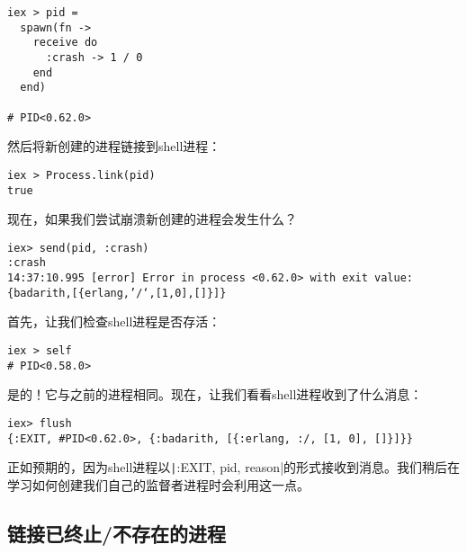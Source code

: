 \begin{code}{}
\begin{verbatim}
iex > pid =
  spawn(fn ->
    receive do
      :crash -> 1 / 0
    end
  end)

# PID<0.62.0>
\end{verbatim}
\end{code}

然后将新创建的进程链接到shell进程：

\begin{code}{}
\begin{verbatim}
iex > Process.link(pid)
true
\end{verbatim}
\end{code}

现在，如果我们尝试崩溃新创建的进程会发生什么？

\begin{code}{}
\begin{verbatim}
iex> send(pid, :crash)
:crash
14:37:10.995 [error] Error in process <0.62.0> with exit value: {badarith,[{erlang,’/‘,[1,0],[]}]}
\end{verbatim}
\end{code}

首先，让我们检查shell进程是否存活：

\begin{code}{}
\begin{verbatim}
iex > self
# PID<0.58.0>
\end{verbatim}
\end{code}

是的！它与之前的进程相同。现在，让我们看看shell进程收到了什么消息：

\begin{code}{}
\begin{verbatim}
iex> flush
{:EXIT, #PID<0.62.0>, {:badarith, [{:erlang, :/, [1, 0], []}]}}
\end{verbatim}
\end{code}

正如预期的，因为shell进程以\texttt|{:EXIT, pid, reason}|的形式接收到消息。我们稍后在学习如何创建我们自己的监督者进程时会利用这一点。

\subsection{链接已终止/不存在的进程}

